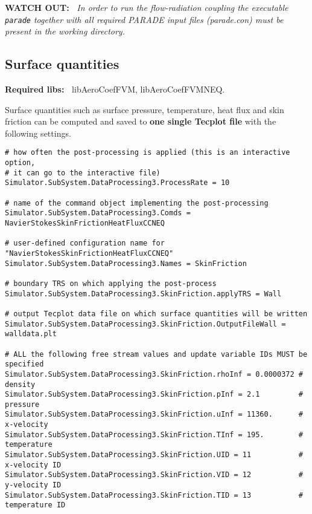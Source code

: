 \documentclass[11pt]{article}
\begin{document}
{\bf WATCH OUT:~} {\it In order to run the flow-radiation coupling the executable {\tt parade} together 
  with all required PARADE input files (parade.con) must be present in the working directory.}

\subsection{Surface quantities}

{\bf Required libs:~} libAeroCoefFVM, libAeroCoefFVMNEQ.

Surface quantities such as surface pressure, temperature, heat flux and skin friction
can be computed and saved to {\bf one single Tecplot file} with the following settings.

\begin{verbatim}
# how often the post-processing is applied (this is an interactive option, 
# it can go to the interactive file)
Simulator.SubSystem.DataProcessing3.ProcessRate = 10

# name of the command object implementing the post-processing
Simulator.SubSystem.DataProcessing3.Comds = NavierStokesSkinFrictionHeatFluxCCNEQ

# user-defined configuration name for "NavierStokesSkinFrictionHeatFluxCCNEQ"
Simulator.SubSystem.DataProcessing3.Names = SkinFriction

# boundary TRS on which applying the post-process
Simulator.SubSystem.DataProcessing3.SkinFriction.applyTRS = Wall

# output Tecplot data file on which surface quantities will be written
Simulator.SubSystem.DataProcessing3.SkinFriction.OutputFileWall = walldata.plt

# ALL the following free stream values and update variable IDs MUST be specified
Simulator.SubSystem.DataProcessing3.SkinFriction.rhoInf = 0.0000372 # density
Simulator.SubSystem.DataProcessing3.SkinFriction.pInf = 2.1         # pressure
Simulator.SubSystem.DataProcessing3.SkinFriction.uInf = 11360.      # x-velocity
Simulator.SubSystem.DataProcessing3.SkinFriction.TInf = 195.        # temperature
Simulator.SubSystem.DataProcessing3.SkinFriction.UID = 11           # x-velocity ID
Simulator.SubSystem.DataProcessing3.SkinFriction.VID = 12           # y-velocity ID
Simulator.SubSystem.DataProcessing3.SkinFriction.TID = 13           # temperature ID
\end{verbatim}
\end{document}
